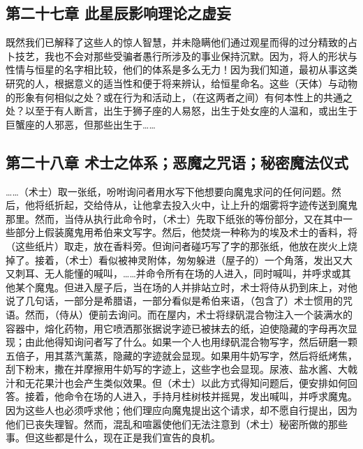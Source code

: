 
\subsection{第二十七章 此星辰影响理论之虚妄}

既然我们已解释了这些人的惊人智慧，并未隐瞒他们通过观星而得的过分精致的占卜技艺，我也不会对那些受骗者愚行所涉及的事业保持沉默。因为，将人的形状与性情与恒星的名字相比较，他们的体系是多么无力！因为我们知道，最初从事这类研究的人，根据意义的适当性和便于将来辨认，给恒星命名。这些（天体）与动物的形象有何相似之处？或在行为和活动上，（在这两者之间）有何本性上的共通之处？以至于有人断言，出生于狮子座的人易怒，出生于处女座的人温和，或出生于巨蟹座的人邪恶，但那些出生于……\par


\subsection{第二十八章 术士之体系；恶魔之咒语；秘密魔法仪式}

……（术士）取一张纸，吩咐询问者用水写下他想要向魔鬼求问的任何问题。然后，他将纸折起，交给侍从，让他拿去投入火中，让上升的烟雾将字迹传送到魔鬼那里。然而，当侍从执行此命令时，（术士）先取下纸张的等份部分，又在其中一些部分上假装魔鬼用希伯来文写字。然后，他焚烧一种称为的埃及术士的香料，将（这些纸片）取走，放在香料旁。但询问者碰巧写了字的那张纸，他放在炭火上烧掉了。接着，（术士）看似被神灵附体，匆匆躲进（屋子的）一个角落，发出又大又刺耳、无人能懂的喊叫，……并命令所有在场的人进入，同时喊叫，并呼求或其他某个魔鬼。但进入屋子后，当在场的人并排站立时，术士将侍从扔到床上，对他说了几句话，一部分是希腊语，一部分看似是希伯来语，（包含了）术士惯用的咒语。然而，（侍从）便前去询问。而在屋内，术士将绿矾混合物注入一个装满水的容器中，熔化药物，用它喷洒那张据说字迹已被抹去的纸，迫使隐藏的字母再次显现；由此他得知询问者写了什么。如果一个人也用绿矾混合物写字，然后研磨一颗五倍子，用其蒸汽薰蒸，隐藏的字迹就会显现。如果用牛奶写字，然后将纸烤焦，刮下粉末，撒在并摩擦用牛奶写的字迹上，这些字也会显现。尿液、盐水酱、大戟汁和无花果汁也会产生类似效果。但（术士）以此方式得知问题后，便安排如何回答。接着，他命令在场的人进入，手持月桂树枝并摇晃，发出喊叫，并呼求魔鬼。因为这些人也必须呼求他；他们理应向魔鬼提出这个请求，却不愿自行提出，因为他们已丧失理智。然而，混乱和喧嚣使他们无法注意到（术士）秘密所做的那些事。但这些都是什么，现在正是我们宣告的良机。\par


